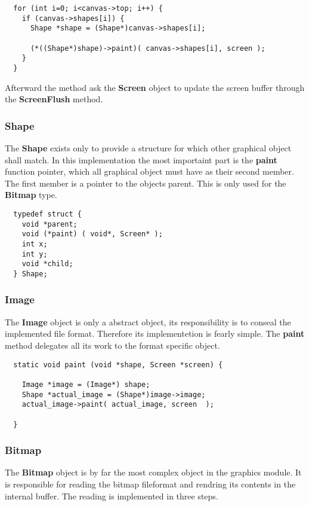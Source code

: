 \begin{lstlisting}
  for (int i=0; i<canvas->top; i++) {
    if (canvas->shapes[i]) {
      Shape *shape = (Shape*)canvas->shapes[i];

      (*((Shape*)shape)->paint)( canvas->shapes[i], screen );
    }
  }
\end{lstlisting}

Afterward the method ask the {\bf Screen} object to update the screen
buffer through the {\bf ScreenFlush} method.

\subsubsection{Shape}
The {\bf Shape} exists only to provide a structure for which other
graphical object shall match. In this implementation the most
importaint part is the {\bf paint} function pointer, which all
graphical object must have as their second member. The first member is
a pointer to the objects parent. This is only used for the {\bf Bitmap}
type.
\begin{lstlisting}
  typedef struct {
    void *parent;
    void (*paint) ( void*, Screen* );
    int x;
    int y;
    void *child;
  } Shape;
\end{lstlisting}

\subsubsection{Image}
The {\bf Image} object is only a abstract object, its responsibility
is to conseal the implemented file format. Therefore its implementetion
is fearly simple. The {\bf paint} method delegates all its work to the
format specific object.
\begin{lstlisting}
  static void paint (void *shape, Screen *screen) {

    Image *image = (Image*) shape;
    Shape *actual_image = (Shape*)image->image;
    actual_image->paint( actual_image, screen  );

  }
\end{lstlisting}

\subsubsection{Bitmap}
The {\bf Bitmap} object is by far the most complex object in the
graphics module. It is responsible for reading the bitmap fileformat
and rendring its contents in the internal buffer. The reading is
implemented in three steps.

